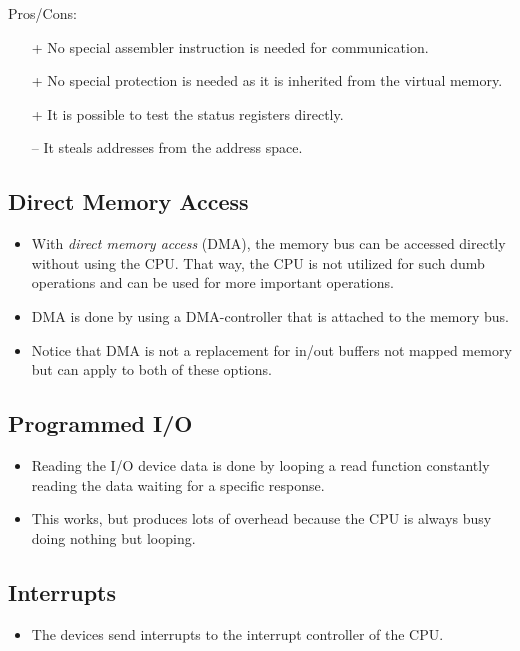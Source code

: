 				Pros/Cons:
				\begin{itemize}
					\item[+] No special assembler instruction is needed for communication.
					\item[+] No special protection is needed as it is inherited from the virtual memory.
					\item[+] It is possible to test the status registers directly.
					\item[--] It steals addresses from the address space.
				\end{itemize}

			\subsection{Direct Memory Access}
				\begin{itemize}
					\item With \textit{direct memory access} (DMA), the memory bus can be accessed directly without using the CPU. That way, the CPU is not utilized for such dumb operations and can be used for more important operations.
					\item DMA is done by using a DMA-controller that is attached to the memory bus.
					\item Notice that DMA is not a replacement for in/out buffers not mapped memory but can apply to both of these options.
				\end{itemize}

		\subsection{Programmed I/O}
			\begin{itemize}
				\item Reading the I/O device data is done by looping a read function constantly reading the data waiting for a specific response.
				\item This works, but produces lots of overhead because the CPU is always busy doing nothing but looping.
			\end{itemize}

		\subsection{Interrupts}
			\begin{itemize}
				\item The devices send interrupts to the interrupt controller of the CPU.
			\end{itemize}


